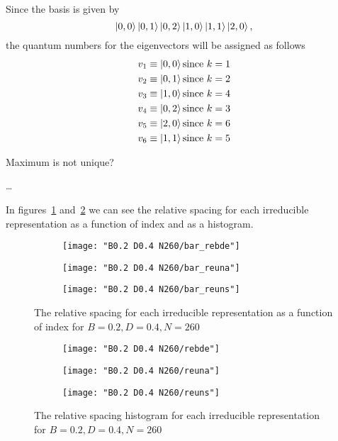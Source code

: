 \documentclass[../thesis.tex]{subfiles}
\begin{document}
Since the basis is given by
\[
  \ket{0, 0} \ket{0, 1} \ket{0, 2} \ket{1, 0} \ket{1, 1} \ket{2, 0},
\]
the quantum numbers for the eigenvectors will be assigned as follows
\begin{align*}
  v_1 &\equiv \ket{0, 0} \text{since}\ k = 1 \\
  v_2 &\equiv \ket{0, 1} \text{since}\ k = 2 \\
  v_3 &\equiv \ket{1, 0} \text{since}\ k = 4 \\
  v_4 &\equiv \ket{0, 2} \text{since}\ k = 3 \\
  v_5 &\equiv \ket{2, 0} \text{since}\ k = 6 \\
  v_6 &\equiv \ket{1, 1} \text{since}\ k = 5
\end{align*}

{\color{red} Maximum is not unique? \\ \centerline{\dots}}

In figures~\ref{fig:bar-rep-b0.2n120} and~\ref{fig:hist-rep-b0.2n120}
we can see the relative spacing for each irreducible representation as a function
of index and as a histogram.

\begin{figure}
  \centering
  \begin{subfigure}[b]{0.49\textwidth}
    \centering
    \texttt{[image: "B0.2 D0.4 N260/bar\_rebde"]}
  \end{subfigure}
  \begin{subfigure}[b]{0.49\textwidth}
    \centering
    \texttt{[image: "B0.2 D0.4 N260/bar\_reuna"]}
  \end{subfigure}
  \begin{subfigure}[b]{0.49\textwidth}
    \centering
    \texttt{[image: "B0.2 D0.4 N260/bar\_reuns"]}
  \end{subfigure}
  \caption{The relative spacing for each irreducible representation as a function
  of index for \(B=0.2, D=0.4, N=260\)}
  \label{fig:bar-rep-b0.2n120}  %
\end{figure}

\begin{figure}
  \centering
  \begin{subfigure}[b]{0.49\textwidth}
    \centering
    \texttt{[image: "B0.2 D0.4 N260/rebde"]}
  \end{subfigure}
  \begin{subfigure}[b]{0.49\textwidth}
    \centering
    \texttt{[image: "B0.2 D0.4 N260/reuna"]}
  \end{subfigure}
  \begin{subfigure}[b]{0.49\textwidth}
    \centering
    \texttt{[image: "B0.2 D0.4 N260/reuns"]}
  \end{subfigure}
  \caption{The relative spacing histogram for each irreducible representation for
  \(B=0.2, D=0.4, N=260\)}
\label{fig:hist-rep-b0.2n120}
\end{figure}
\end{document}
